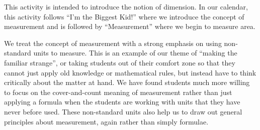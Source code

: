 \documentclass[nooutcomes]{ximera}
\begin{document}
\newpage
\begin{instructorNotes}
    This activity is intended to introduce the notion of dimension.  In our calendar, this activity follows ``I'm the Biggest Kid!'' where we introduce the concept of measurement and is followed by ``Measurement'' where we begin to measure area.
    
    We treat the concept of measurement with a strong emphasis on using non-standard units to measure.  This is an example of our theme of ``making the familiar strange'', or taking students out of their comfort zone so that they cannot just apply old knowledge or mathematical rules, but instead have to think critically about the matter at hand.  We have found students much more willing to focus on the cover-and-count meaning of measurement rather than just applying a formula when the students are working with units that they have never before used.  These non-standard units also help us to draw out general principles about measurement, again rather than simply formulae.
    

\end{instructorNotes}
\end{document}
